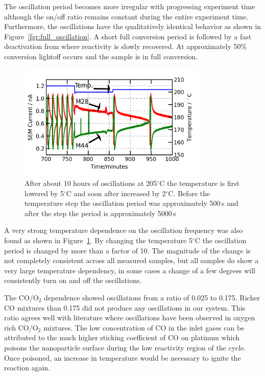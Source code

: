 \documentclass[8.5pt,twoside,twocolumn]{article}
\begin{document}
The oscillation period becomes more irregular with progressing experiment time although the on/off ratio remains constant during the entire experiment time. Furthermore, the oscillations have the qualitatively identical behavior as shown in Figure~\ref{fgr:full_oscillation}. A short full conversion period is followed by a fast deactivation from where reactivity is slowly recovered. At approximately 50\% conversion lightoff occurs and the sample is in full conversion.

\begin{figure}[h]
\centering
  \includegraphics[width=9cm]{temperature_dependence.png}
  \caption{After about 10 hours of oscillations at 205$^\circ$C the temperature is first lowered by 5$^\circ$C and soon after increased by 2$^\circ$C. Before the temperature step the oscillation period was approximately 500\,s and after the step the period is approximately 5000\,s}
  \label{fgr:temperature_dependence}
\end{figure}
A very strong temperature dependence on the oscillation frequency was also found as shown in Figure~\ref{fgr:temperature_dependence}. By changing the temperature 5$^\circ$C the oscillation period is changed by more than a factor of 10. The magnitude of the change is not completely consistent across all measured samples, but all samples do show a very large temperature dependency, in some cases a change of a few degrees will consistently turn on and off the oscillations.


The CO/O$_2$ dependence showed oscillations from a ratio of 0.025 to 0.175. Richer CO mixtures than 0.175 did not produce any oscillations in our system. This ratio agrees well with literature \cite{Singh2010,Hendriksen2005} where oscillations have been observed in oxygen rich CO/O$_2$ mixtures. The low concentration of CO in the inlet gases can be attributed to the much higher sticking coefficient of CO on platinum which poisons the nanoparticle surface during the low reactivity region of the cycle. Once poisoned, an increase in temperature would be necessary to ignite the reaction again.
\end{document}
